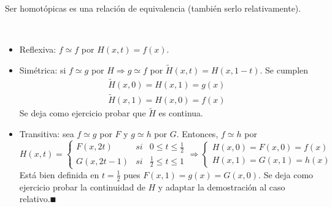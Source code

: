 \documentclass[GTS.tex]{subfiles}
\begin{document}
\begin{lemma} Ser homotópicas es una relación de equivalencia (también serlo relativamente).
\end{lemma}
\begin{dem}\
\begin{itemize}
\item Reflexiva: $f\simeq f$ por $H(x,t)=f(x)$.
\item Simétrica: si $f\simeq g$ por $H\Rightarrow g\simeq f$ por $\widetilde{H}(x,t)=H(x,1-t)$. Se cumplen
\begin{gather*}
\widetilde{H}(x,0)=H(x,1)=g(x)\\
\widetilde{H}(x,1)=H(x,0)=f(x)
\end{gather*}
Se deja como ejercicio probar que $\widetilde{H}$ es continua.
\item Transitiva: sea $f\simeq g$ por $F$ y $g\simeq h$ por $G$. Entonces, $f\simeq h$ por
\begin{equation*}
H(x,t)=\left\{\begin{array}{ccc}
F(x,2t) & si & 0\leq t\leq\frac{1}{2}\\
G(x,2t-1) & si & \frac{1}{2}\leq t\leq 1
\end{array}\right.\Longrightarrow\left\{\begin{array}{c}
H(x,0)=F(x,0)=f(x)\\
H(x,1)=G(x,1)=h(x)
\end{array}\right.
\end{equation*}
Está bien definida en $t=\frac{1}{2}$ pues $F(x,1)=g(x)=G(x,0)$. Se deja como ejercicio probar la continuidad de $H$ y adaptar la demostración al caso relativo.$\QED$
\end{itemize}
\end{dem}
\end{document}
